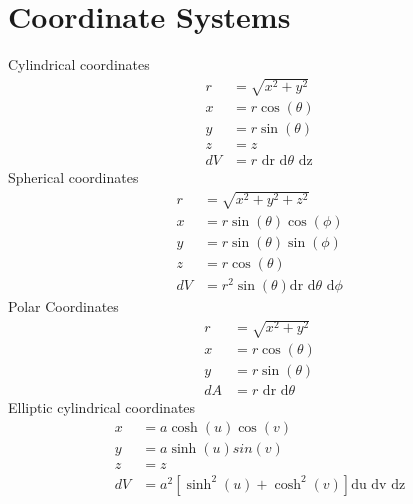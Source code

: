 \section{Coordinate Systems}
\begin{multicols}{2}
Cylindrical coordinates
\begin{align}
r&=\sqrt{x^2+y^2} \\
x&=r\cos(\theta) \\
y&=r\sin(\theta) \\
z&=z \\
dV&= r \textrm{ dr d$\theta$ dz}
\end{align}
Spherical coordinates
\begin{align}
r&=\sqrt{x^2+y^2+z^2} \\
x&=r\sin(\theta)\cos(\phi) \\
y&=r\sin(\theta)\sin(\phi) \\
z&=r\cos(\theta) \\
dV&=r^2\sin(\theta)\textrm{dr d$\theta$ d$\phi$}
\end{align}
Polar Coordinates
\begin{align}
	r&=\sqrt{x^2+y^2} \\
	x&=r\cos(\theta) \\
	y&=r\sin(\theta) \\
	dA&= r \textrm{ dr d$\theta$}
\end{align}
Elliptic cylindrical coordinates
\begin{align}
	x&= a \cosh(u) \cos(v) \\
	y&= a \sinh(u) sin(v) \\
	z&= z \\
	dV&=a^2[\sinh^2(u)+\cosh^2(v)]\textrm{du dv dz}
\end{align}
\end{multicols}